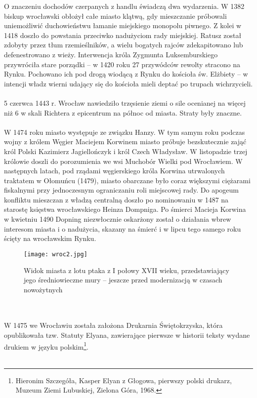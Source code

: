\documentclass[12pt]{article}
\begin{document}
O znaczeniu dochodów czerpanych z handlu świadczą dwa wydarzenia. W 1382 biskup wrocławski obłożył całe miasto klątwą, gdy mieszczanie próbowali uniemożliwić duchowieństwu łamanie miejskiego monopolu piwnego. Z kolei w 1418 doszło do powstania przeciwko nadużyciom rady miejskiej. Ratusz został zdobyty przez tłum rzemieślników, a wielu bogatych rajców zdekapitowano lub defenestrowano z wieży. Interwencja króla Zygmunta Luksemburskiego przywróciła stare porządki – w 1420 roku 27 przywódców rewolty stracono na Rynku. Pochowano ich pod drogą wiodącą z Rynku do kościoła św. Elżbiety – w intencji władz wierni udający się do kościoła mieli deptać po trupach wichrzycieli.\\\\
5 czerwca 1443 r. Wrocław nawiedziło trzęsienie ziemi o sile ocenianej na więcej niż 6 w skali Richtera z epicentrum na północ od miasta. Straty były znaczne.\\\\
W 1474 roku miasto występuje ze związku Hanzy. W tym samym roku podczas wojny z królem Węgier Maciejem Korwinem miasto próbuje bezskutecznie zająć król Polski Kazimierz Jagiellończyk i król Czech Władysław. W listopadzie trzej królowie doszli do porozumienia we wsi Muchobór Wielki pod Wrocławiem. W następnych latach, pod rządami węgierskiego króla Korwina utrwalonych traktatem w Ołomuńcu (1479), miasto obarczane było coraz większymi ciężarami fiskalnymi przy jednoczesnym ograniczaniu roli miejscowej rady. Do apogeum konfliktu mieszczan z władzą centralną doszło po nominowaniu w 1487 na starostę księstwa wrocławskiego Heinza Dompniga. Po śmierci Macieja Korwina w kwietniu 1490 Dopning niezwłocznie oskarżony został o działania wbrew interesom miasta i o nadużycia, skazany na śmierć i w lipcu tego samego roku ścięty na wrocławskim Rynku.
\begin{figure}[h]
    \centering
    \texttt{[image: wroc2.jpg]}
    \caption{Widok miasta z lotu ptaka z I połowy XVII wieku, przedstawiający jego średniowieczne mury – jeszcze przed modernizacją w czasach nowożytnych}
    \label{fig:wroc2}
\end{figure}\\\\
W 1475 we Wrocławiu została założona Drukarnia Świętokrzyska, która opublikowała tzw. Statuty Elyana, zawierające pierwsze w historii teksty wydane drukiem w języku polskim\footnote{Hieronim Szczegóła, Kasper Elyan z Głogowa, pierwszy polski drukarz, Muzeum Ziemi Lubuskiej, Zielona Góra, 1968.}.\\\\
\end{document}

